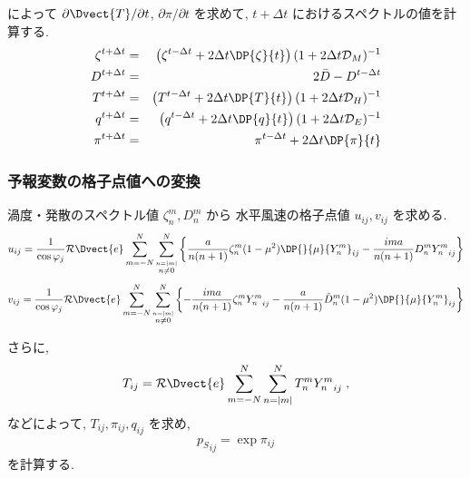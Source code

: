 %
によって
$\partial \Dvect{T}/\partial t$,
$\partial \pi/\partial t$ 
を求めて, $t+\Delta t$ におけるスペクトルの値を計算する.
\begin{eqnarray}
  \zeta^{t+\Delta t} & = & \left( \zeta^{t-\Delta t}
                                +   2 \Delta t \DP{\zeta}{t} \right)
                          ( 1 + 2 \Delta t {\cal D}_M )^{-1} \\
  D^{t+\Delta t} & = & 2 \bar{D} - D^{t-\Delta t}\\
  T^{t+\Delta t} & = & \left( T^{t-\Delta t}
                                +  2 \Delta t  \DP{T}{t} \right)
                          ( 1 + 2 \Delta t {\cal D}_H )^{-1} \\
  q^{t+\Delta t} & = & \left( q^{t-\Delta t}
                                +  2 \Delta t \DP{q}{t} \right)
                          ( 1 + 2 \Delta t {\cal D}_E )^{-1} \\
\pi^{t+\Delta t} & = & \pi^{t-\Delta t}
                                +  2 \Delta t \DP{\pi}{t}
\end{eqnarray}

\subsubsection{予報変数の格子点値への変換}


渦度・発散のスペクトル値 $\zeta_n^m, D_n^m$ から
水平風速の格子点値 $u_{ij}, v_{ij}$ を求める.
\begin{equation}
  u_{ij}
  =  \frac{1}{\cos \varphi_j}
     {\cal R}\Dvect{e} \sum_{m=-N}^{N} 
                       \sum_{\stackrel{n=|m|}{n \neq 0}}^{N} 
    \left\{
             \frac{a}{n(n+1)} \zeta_n^m 
            (1-\mu^{2}) \DP{}{\mu} {Y_n^m}_{ij}
          -  \frac{im a}{n(n+1)} D_n^m {Y_n^m}_{ij}
    \right\}
\end{equation}
%
\begin{equation}
  v_{ij}
  =  \frac{1}{\cos \varphi_j}
     {\cal R}\Dvect{e} \sum_{m=-N}^{N}
                       \sum_{\stackrel{n=|m|}{n \neq 0}}^{N}
    \left\{
          -  \frac{im a}{n(n+1)} \zeta_n^m  {Y_n^m}_{ij}
          -  \frac{a}{n(n+1)} \tilde{D}_n^m 
            (1-\mu^{2}) \DP{}{\mu} {Y_n^m}_{ij}
    \right\}
\end{equation}

さらに,
\begin{equation}
  T_{ij} 
   =  {\cal R}\Dvect{e} \sum_{m=-N}^{N} \sum_{n=|m|}^{N} 
      T_n^m  {Y_n^m}_{ij} \; ,
\end{equation}
などによって, $T_{ij}, \pi_{ij}, q_{ij}$ を求め,
\begin{eqnarray}
  {p_S}_{ij} = \exp \pi_{ij} 
\end{eqnarray}
を計算する.

